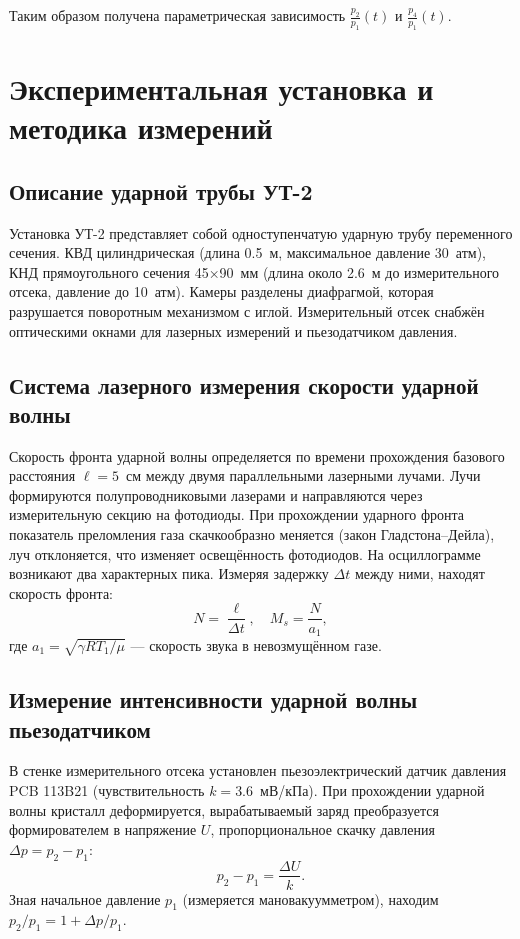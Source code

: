 \documentclass[12pt,a4paper]{article}
\begin{document}
Таким образом получена параметрическая зависимость $\frac{p_2}{p_1}(t)$ и $\frac{p_4}{p_1}(t)$.

\section{Экспериментальная установка и методика измерений}
\subsection{Описание ударной трубы УТ-2}
Установка УТ-2 представляет собой одноступенчатую ударную трубу переменного сечения. КВД цилиндрическая (длина 0.5~м, максимальное давление 30~атм), КНД прямоугольного сечения 45×90~мм (длина около 2.6~м до измерительного отсека, давление до 10~атм). Камеры разделены диафрагмой, которая разрушается поворотным механизмом с иглой. Измерительный отсек снабжён оптическими окнами для лазерных измерений и пьезодатчиком давления.

\subsection{Система лазерного измерения скорости ударной волны}
Скорость фронта ударной волны определяется по времени прохождения базового расстояния $\ell = 5$~см между двумя параллельными лазерными лучами. Лучи формируются полупроводниковыми лазерами и направляются через измерительную секцию на фотодиоды. При прохождении ударного фронта показатель преломления газа скачкообразно меняется (закон Гладстона–Дейла), луч отклоняется, что изменяет освещённость фотодиодов. На осциллограмме возникают два характерных пика. Измеряя задержку $\Delta t$ между ними, находят скорость фронта:
\[
N = \frac{\ell}{\Delta t},\quad M_s = \frac{N}{a_1},
\]
где $a_1 = \sqrt{\gamma R T_1/\mu}$ — скорость звука в невозмущённом газе.

\subsection{Измерение интенсивности ударной волны пьезодатчиком}
В стенке измерительного отсека установлен пьезоэлектрический датчик давления PCB 113B21 (чувствительность $k = 3.6$~мВ/кПа). При прохождении ударной волны кристалл деформируется, вырабатываемый заряд преобразуется формирователем в напряжение $U$, пропорциональное скачку давления $\Delta p = p_2-p_1$:
\[
p_2-p_1 = \frac{\Delta U}{k}.
\]
Зная начальное давление $p_1$ (измеряется мановакуумметром), находим $p_2/p_1 = 1 + \Delta p/p_1$.
\end{document}
